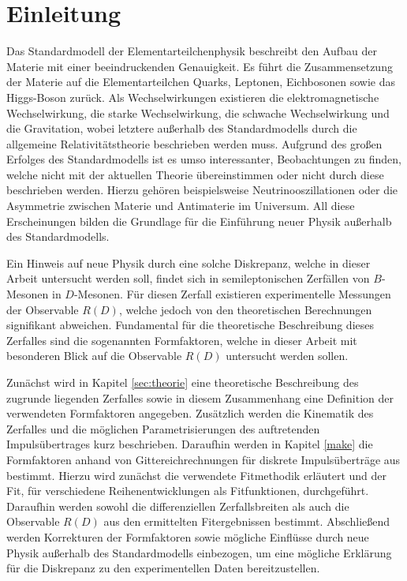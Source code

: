 \chapter{Einleitung}

Das Standardmodell der Elementarteilchenphysik beschreibt den Aufbau der Materie mit einer beeindruckenden Genauigkeit.
Es führt die Zusammensetzung der Materie auf die Elementarteilchen Quarks, Leptonen, Eichbosonen sowie das Higgs-Boson zurück.
Als Wechselwirkungen existieren die elektromagnetische Wechselwirkung, die starke Wechselwirkung, die schwache Wechselwirkung und die Gravitation, wobei letztere außerhalb des Standardmodells durch die allgemeine Relativitätstheorie beschrieben werden muss.
Aufgrund des großen Erfolges des Standardmodells ist es umso interessanter, Beobachtungen zu finden, welche nicht mit der aktuellen Theorie übereinstimmen oder nicht durch diese beschrieben werden.
Hierzu gehören beispielsweise Neutrinooszillationen oder die Asymmetrie zwischen Materie und Antimaterie im Universum.
All diese Erscheinungen bilden die Grundlage für die Einführung neuer Physik außerhalb des Standardmodells.

Ein Hinweis auf neue Physik durch eine solche Diskrepanz, welche in dieser Arbeit untersucht werden soll, findet sich in semileptonischen Zerfällen von $B$-Mesonen in $D$-Mesonen.
Für diesen Zerfall existieren experimentelle Messungen der Observable $R(D)$, welche jedoch von den theoretischen Berechnungen signifikant abweichen.
Fundamental für die theoretische Beschreibung dieses Zerfalles sind die sogenannten Formfaktoren, welche in dieser Arbeit mit besonderen Blick auf die Observable $R(D)$ untersucht werden sollen.

Zunächst wird in Kapitel \ref{sec:theorie} eine theoretische Beschreibung des zugrunde liegenden Zerfalles sowie in diesem Zusammenhang eine Definition der verwendeten Formfaktoren angegeben.
Zusätzlich werden die Kinematik des Zerfalles und die möglichen Parametrisierungen des auftretenden Impulsübertrages kurz beschrieben.
Daraufhin werden in Kapitel \ref{make} die Formfaktoren anhand von Gittereichrechnungen für diskrete Impulsüberträge aus \cite{PhysRevD.92.034506} bestimmt.
Hierzu wird zunächst die verwendete Fitmethodik erläutert und der Fit, für verschiedene Reihenentwicklungen als Fitfunktionen, durchgeführt.
Daraufhin werden sowohl die differenziellen Zerfallsbreiten als auch die Observable $R(D)$ aus den ermittelten Fitergebnissen bestimmt.
Abschließend werden Korrekturen der Formfaktoren sowie mögliche Einflüsse durch neue Physik außerhalb des Standardmodells einbezogen, um eine mögliche Erklärung für die Diskrepanz zu den experimentellen Daten bereitzustellen.
